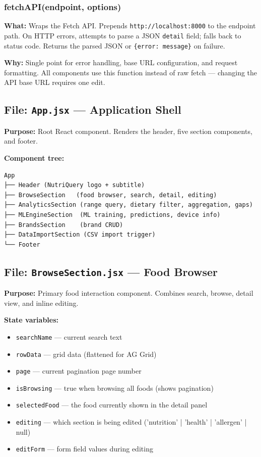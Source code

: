 \documentclass[12pt,a4paper]{article}
\begin{document}
\subsubsection{fetchAPI(endpoint, options)}
\textbf{What:} Wraps the Fetch API. Prepends \texttt{http://localhost:8000} to the endpoint path. On HTTP errors, attempts to parse a JSON \texttt{detail} field; falls back to status code. Returns the parsed JSON or \texttt{\{error: message\}} on failure.

\textbf{Why:} Single point for error handling, base URL configuration, and request formatting. All components use this function instead of raw fetch — changing the API base URL requires one edit.

\subsection{File: \texttt{App.jsx} — Application Shell}

\textbf{Purpose:} Root React component. Renders the header, five section components, and footer.

\textbf{Component tree:}
\begin{verbatim}
App
├── Header (NutriQuery logo + subtitle)
├── BrowseSection   (food browser, search, detail, editing)
├── AnalyticsSection (range query, dietary filter, aggregation, gaps)
├── MLEngineSection  (ML training, predictions, device info)
├── BrandsSection    (brand CRUD)
├── DataImportSection (CSV import trigger)
└── Footer
\end{verbatim}

\subsection{File: \texttt{BrowseSection.jsx} — Food Browser}

\textbf{Purpose:} Primary food interaction component. Combines search, browse, detail view, and inline editing.

\textbf{State variables:}
\begin{itemize}[nosep]
    \item \texttt{searchName} — current search text
    \item \texttt{rowData} — grid data (flattened for AG Grid)
    \item \texttt{page} — current pagination page number
    \item \texttt{isBrowsing} — true when browsing all foods (shows pagination)
    \item \texttt{selectedFood} — the food currently shown in the detail panel
    \item \texttt{editing} — which section is being edited ('nutrition' | 'health' | 'allergen' | null)
    \item \texttt{editForm} — form field values during editing
\end{itemize}
\end{document}
